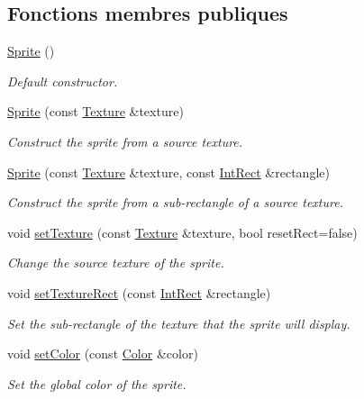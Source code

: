 \subsection*{Fonctions membres publiques}
\begin{DoxyCompactItemize}
\item 
\hyperlink{classsf_1_1Sprite_a92559fbca895a96758abf5eabab96984}{Sprite} ()
\begin{DoxyCompactList}\small\item\em Default constructor. \end{DoxyCompactList}\item 
\hyperlink{classsf_1_1Sprite_a2a9fca374d7abf084bb1c143a879ff4a}{Sprite} (const \hyperlink{classsf_1_1Texture}{Texture} \&texture)
\begin{DoxyCompactList}\small\item\em Construct the sprite from a source texture. \end{DoxyCompactList}\item 
\hyperlink{classsf_1_1Sprite_a01cfe1402372d243dbaa2ffa96020206}{Sprite} (const \hyperlink{classsf_1_1Texture}{Texture} \&texture, const \hyperlink{classsf_1_1Rect}{Int\+Rect} \&rectangle)
\begin{DoxyCompactList}\small\item\em Construct the sprite from a sub-\/rectangle of a source texture. \end{DoxyCompactList}\item 
void \hyperlink{classsf_1_1Sprite_a3729c88d88ac38c19317c18e87242560}{set\+Texture} (const \hyperlink{classsf_1_1Texture}{Texture} \&texture, bool reset\+Rect=false)
\begin{DoxyCompactList}\small\item\em Change the source texture of the sprite. \end{DoxyCompactList}\item 
void \hyperlink{classsf_1_1Sprite_a3fefec419a4e6a90c0fd54c793d82ec2}{set\+Texture\+Rect} (const \hyperlink{classsf_1_1Rect}{Int\+Rect} \&rectangle)
\begin{DoxyCompactList}\small\item\em Set the sub-\/rectangle of the texture that the sprite will display. \end{DoxyCompactList}\item 
void \hyperlink{classsf_1_1Sprite_a14def44da6437bfea20c4df5e71aba4c}{set\+Color} (const \hyperlink{classsf_1_1Color}{Color} \&color)
\begin{DoxyCompactList}\small\item\em Set the global color of the sprite. \end{DoxyCompactList}\item 

\end{DoxyCompactItemize}

